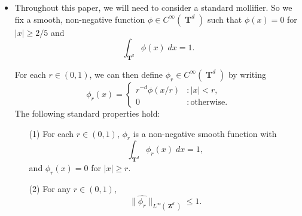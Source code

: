 \documentclass[dvipsnames,letterpaper,12pt]{article}
\numberwithin{equation}{section}
\DeclareMathOperator{\ZZ}{\mathbf{Z}}
\DeclareMathOperator{\TT}{\mathbf{T}}
\newtheorem{theorem}{Theorem}
\numberwithin{theorem}{section}
\begin{document}
\begin{itemize}
    \item Throughout this paper, we will need to consider a standard mollifier. So we fix a smooth, non-negative function $\phi \in C^\infty(\TT^d)$ such that $\phi(x) = 0$ for $|x| \geq 2/5$ and
%
\[ \int_{\TT^d} \phi(x)\; dx = 1. \]
%
\begin{comment}
\begin{theorem} \label{equationASFGCISIX}
    There exists a smooth probability density $\phi \in C^\infty(\TT^d)$ such that $\phi(x) = 0$ for $|x| \geq 2/5$, and such that for each $x \in \TT^d$
    \[ \sum_{k \in \{ 0, 1 \}^d} \phi(x + k/2) = 2^d. \]
\end{theorem}
\begin{proof}
    Let $\psi$ be a non-negative smooth function on $\TT$ such that $\psi(x) = \psi(- x)$ for all $x \in \TT$, $\psi(x) = 1$ for $|x| \leq 1/10$, $\psi(x) = 0$ for $|x| \geq 2/10$, and $0 \leq \psi(x) \leq 1$ for all $x \in \TT$. Then define $\eta$ to be the non-negative, $C^\infty$ function
    \[ \eta(x) = \frac{1}{2} - \frac{\psi(x) + \psi(x + 1/2)}{2}. \]
    If we define
    \[ \phi_0(x) = 2(\psi(x) + \eta(x)), \]
    then $\phi_0(x) + \phi_0(x + 1/2) = 2$ for all $x \in \TT$. Moreover, if $|x| \geq 2/5$, then $\psi(x) = 0$, and since this implies $|x + 1/2| \leq 1/10$, we find $\eta(x) = 0$. Thus $\phi_0(x) = 0$ for $|x| \geq 2/5$. But the condition $\phi_0(x) + \phi_0(x + 1/2) = 2$ implies that $\phi_0$ is a probability density function. Thus it suffices to define
    \[ \phi(x_1, \dots, x_d) = \phi_0(x_1) \dots \phi_0(x_d). \qedhere \]
\end{proof}
\end{comment}
%
For each $r \in (0,1)$, we can then define $\phi_r \in C^\infty(\TT^d)$ by writing
%
\[ \phi_r(x) = \begin{cases} r^{-d} \phi(x/r) &: |x| < r, \\ 0 &: \text{otherwise}. \end{cases} \]
%
The following standard properties hold:
%
\begin{enumerate}
    \item[(1)] For each $r \in (0,1)$, $\phi_r$ is a non-negative smooth function with
    \begin{equation}
        \int_{\TT^d} \phi_r(x)\; dx = 1,
    \end{equation}
    and $\phi_r(x) = 0$ for $|x| \geq r$.

    \item[(2)] For any $r \in (0,1)$,
    \begin{equation} \label{equationDIOJAOIJVIV23242}
        \| \widehat{\phi_r} \|_{L^\infty(\ZZ^d)} \leq 1.
    \end{equation}


\end{enumerate}
\end{itemize}
\end{document}
